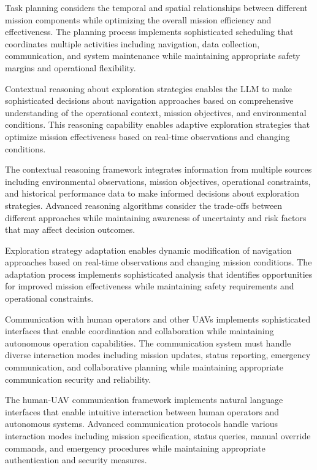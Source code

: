 Task planning considers the temporal and spatial relationships between different mission components while optimizing the overall mission efficiency and effectiveness. The planning process implements sophisticated scheduling that coordinates multiple activities including navigation, data collection, communication, and system maintenance while maintaining appropriate safety margins and operational flexibility.

Contextual reasoning about exploration strategies enables the LLM to make sophisticated decisions about navigation approaches based on comprehensive understanding of the operational context, mission objectives, and environmental conditions. This reasoning capability enables adaptive exploration strategies that optimize mission effectiveness based on real-time observations and changing conditions.

The contextual reasoning framework integrates information from multiple sources including environmental observations, mission objectives, operational constraints, and historical performance data to make informed decisions about exploration strategies. Advanced reasoning algorithms consider the trade-offs between different approaches while maintaining awareness of uncertainty and risk factors that may affect decision outcomes.

Exploration strategy adaptation enables dynamic modification of navigation approaches based on real-time observations and changing mission conditions. The adaptation process implements sophisticated analysis that identifies opportunities for improved mission effectiveness while maintaining safety requirements and operational constraints.

Communication with human operators and other UAVs implements sophisticated interfaces that enable coordination and collaboration while maintaining autonomous operation capabilities. The communication system must handle diverse interaction modes including mission updates, status reporting, emergency communication, and collaborative planning while maintaining appropriate communication security and reliability.

The human-UAV communication framework implements natural language interfaces that enable intuitive interaction between human operators and autonomous systems. Advanced communication protocols handle various interaction modes including mission specification, status queries, manual override commands, and emergency procedures while maintaining appropriate authentication and security measures.

